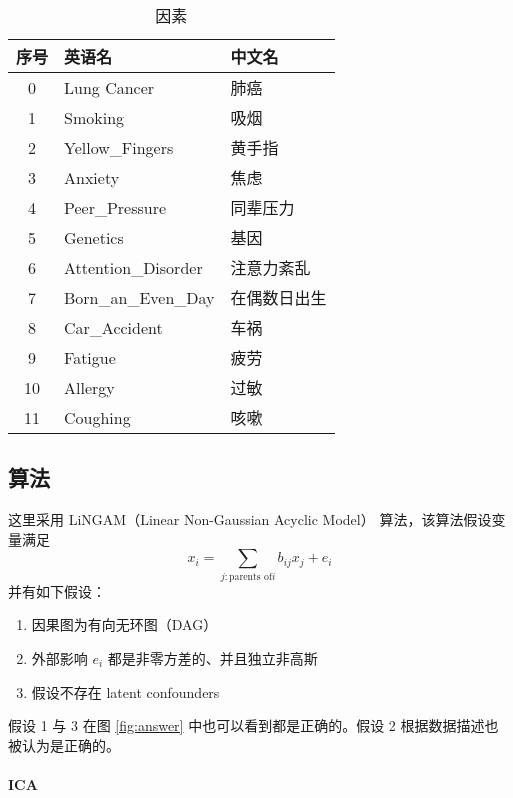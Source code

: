     \begin{table}[ht]
        \centering
        \caption{因素}\label{tab:factors}
        \begin{tabular}{cll}
            \toprule
            序号 & 英语名 & 中文名 \\
            \midrule
            0  & Lung Cancer & 肺癌\\
            1  & Smoking &  吸烟 \\
            2  & Yellow\_Fingers & 黄手指  \\
            3  & Anxiety & 焦虑 \\
            4  & Peer\_Pressure & 同辈压力 \\
            5  & Genetics & 基因 \\
            6  & Attention\_Disorder & 注意力紊乱 \\
            7  & Born\_an\_Even\_Day &  在偶数日出生 \\
            8  & Car\_Accident & 车祸 \\
            9  & Fatigue & 疲劳 \\
            10 & Allergy & 过敏 \\
            11 & Coughing & 咳嗽 \\
            \bottomrule
        \end{tabular}
    \end{table}

    \subsection{算法}

    这里采用 LiNGAM（Linear Non-Gaussian Acyclic Model） 算法\cite{lingam}，该算法假设变量满足
    \begin{equation}\label{eq:sem}
        x_i = \sum_{j:\text{parents of} i} b_{ij}x_j + e_i    
    \end{equation}
    并有如下假设：
    \begin{enumerate}
        \item 因果图为有向无环图（DAG）
        \item 外部影响 $e_i$ 都是非零方差的、并且独立非高斯
        \item 假设不存在 latent confounders
    \end{enumerate}
    假设 1 与 3 在图 \ref{fig:answer} 中也可以看到都是正确的。假设 2 根据数据描述也被认为是正确的。

    \paragraph{ICA}

